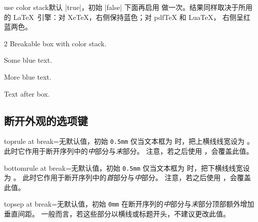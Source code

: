 \begin{docTcbKey}[][doc new=2020-10-09]{use color stack}{}{默认 |true|，初始 |false|}
下面再启用  做一次。结果同样取决于所用的
\LaTeX\ 引擎：对 Xe\TeX{}，右侧保持蓝色；对 pdf\TeX{} 和 Lua\TeX{}，
右侧呈红蓝两色。

\begin{dispExample}
\begin{multicols}{2}\footnotesize
Breakable box with color stack.
\begin{tcolorbox}[enhanced jigsaw, use color stack,
  size=small, colframe=gray, colback=yellow!10!white, colupper=blue,
  enforce breakable,%
  vfill before first, pad at break=1mm, break at=33mm ]
    Some blue text.\par\smallskip
    {\color{red}\itshape\lipsum[2]}\par\smallskip
    More blue text.
\end{tcolorbox}
Text after box.
\end{multicols}
\end{dispExample}

\end{docTcbKey}




\clearpage
\subsection{断开外观的选项键}

\begin{docTcbKey}{toprule at break}{=}{无默认值，初始 \texttt{0.5mm}}
  仅当文本框为  时，把上横线线宽设为 。
  此时它作用于断开序列中的\emph{中}部分与\emph{末}部分。
  注意，若之后使用 ，会覆盖此值。
\end{docTcbKey}


\begin{docTcbKey}{bottomrule at break}{=}{无默认值，初始 \texttt{0.5mm}}
  仅当文本框为  时，把下横线线宽设为 。
  此时它作用于断开序列中的\emph{首}部分与\emph{中}部分。
  注意，若之后使用 ，会覆盖此值。
\end{docTcbKey}


\begin{docTcbKey}{topsep at break}{=}{无默认值，初始 \texttt{0mm}}
  在断开序列的\emph{中}部分与\emph{末}部分顶部额外增加  垂直间距。
  一般而言，若这些部分以横线或标题开头，不建议更改此值。
\end{docTcbKey}

